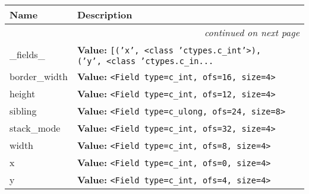     \vspace{-1cm}
\hspace{\varindent}\begin{longtable}{|p{\varnamewidth}|p{\vardescrwidth}|l}
\cline{1-2}
\cline{1-2} \centering \textbf{Name} & \centering \textbf{Description}& \\
\cline{1-2}
\endhead\cline{1-2}\multicolumn{3}{r}{\small\textit{continued on next page}}\\\endfoot\cline{1-2}
\endlastfoot\raggedright \_\-f\-i\-e\-l\-d\-s\-\_\- & \raggedright \textbf{Value:} 
{\tt \texttt{[}\texttt{(}\texttt{'}\texttt{x}\texttt{'}\texttt{, }{\textless}class 'ctypes.c\_int'{\textgreater}\texttt{)}\texttt{, }\texttt{(}\texttt{'}\texttt{y}\texttt{'}\texttt{, }{\textless}class 'ctypes.c\_in\texttt{...}}&\\
\cline{1-2}
\raggedright b\-o\-r\-d\-e\-r\-\_\-w\-i\-d\-t\-h\- & \raggedright \textbf{Value:} 
{\tt {\textless}Field type=c\_int, ofs=16, size=4{\textgreater}}&\\
\cline{1-2}
\raggedright h\-e\-i\-g\-h\-t\- & \raggedright \textbf{Value:} 
{\tt {\textless}Field type=c\_int, ofs=12, size=4{\textgreater}}&\\
\cline{1-2}
\raggedright s\-i\-b\-l\-i\-n\-g\- & \raggedright \textbf{Value:} 
{\tt {\textless}Field type=c\_ulong, ofs=24, size=8{\textgreater}}&\\
\cline{1-2}
\raggedright s\-t\-a\-c\-k\-\_\-m\-o\-d\-e\- & \raggedright \textbf{Value:} 
{\tt {\textless}Field type=c\_int, ofs=32, size=4{\textgreater}}&\\
\cline{1-2}
\raggedright w\-i\-d\-t\-h\- & \raggedright \textbf{Value:} 
{\tt {\textless}Field type=c\_int, ofs=8, size=4{\textgreater}}&\\
\cline{1-2}
\raggedright x\- & \raggedright \textbf{Value:} 
{\tt {\textless}Field type=c\_int, ofs=0, size=4{\textgreater}}&\\
\cline{1-2}
\raggedright y\- & \raggedright \textbf{Value:} 
{\tt {\textless}Field type=c\_int, ofs=4, size=4{\textgreater}}&\\
\cline{1-2}
\end{longtable}



